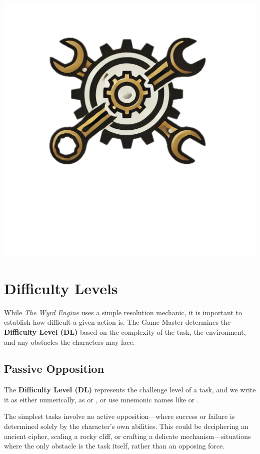 
\vfill
\begin{center}
    \includegraphics[width=\linewidth]{img/separt/gear-logo}
\end{center}
\vfill
\columnbreak

\section{Difficulty Levels}
\label{core:difficulty-levels}

While \emph{The Wyrd Engine} uses a simple resolution mechanic, it is important to establish how difficult a given action is. The Game Master determines the \textbf{Difficulty Level (DL)} based on the complexity of the task, the environment, and any obstacles the characters may face.

\subsection{Passive Opposition}
The \textbf{Difficulty Level (DL)} represents the challenge level of a task, and we write it as either numerically, as  or , or use mnemonic names like \Challenging or \Formidable.

The simplest tasks involve no active opposition—where success or failure is determined solely by the character’s own abilities. This could be deciphering an ancient cipher, scaling a rocky cliff, or crafting a delicate mechanism—situations where the only obstacle is the task itself, rather than an opposing force.

